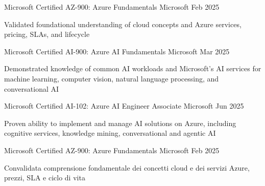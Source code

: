 


\begin{cventries}

\ifenglish
\cventry
{Microsoft Certified} %
{AZ-900: Azure Fundamentals} %
{Microsoft} %
{Feb 2025} %
{ %
\begin{cvitems}
  \item {Validated foundational understanding of cloud concepts and Azure services, pricing, SLAs, and lifecycle}
\end{cvitems}
}

\cventry
{Microsoft Certified} %
{AI-900: Azure AI Fundamentals} %
{Microsoft} %
{Mar 2025} %
{ %
\begin{cvitems}
  \item {Demonstrated knowledge of common AI workloads and Microsoft's AI services for machine learning, computer vision, natural language processing, and conversational AI}
\end{cvitems}
}

\cventry
{Microsoft Certified} %
{AI-102: Azure AI Engineer Associate} %
{Microsoft} %
{Jun 2025} %
{ %
\begin{cvitems}
  \item {Proven ability to implement and manage AI solutions on Azure, including cognitive services, knowledge mining, conversational and agentic AI}
\end{cvitems}
}
\else
\cventry
{Microsoft Certified} %
{AZ-900: Azure Fundamentals} %
{Microsoft} %
{Feb 2025} %
{ %
\begin{cvitems}
  \item {Convalidata comprensione fondamentale dei concetti cloud e dei servizi Azure, prezzi, SLA e ciclo di vita}
\end{cvitems}
}


\end{cventries}
